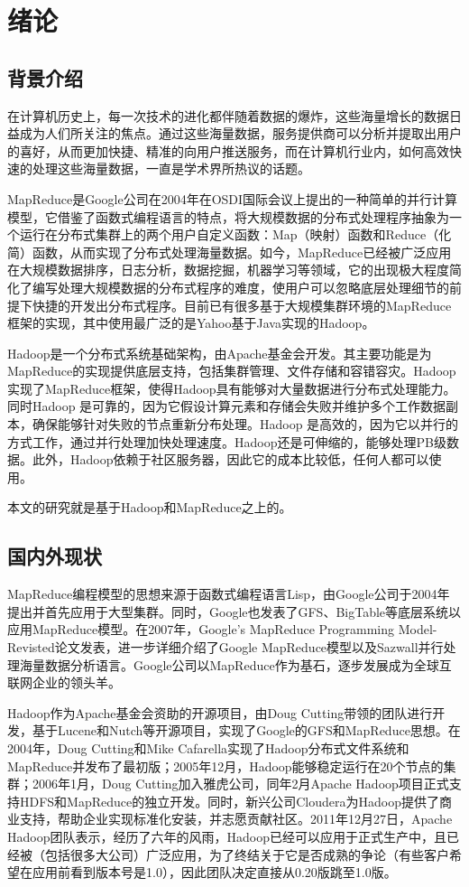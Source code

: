 \chapter{绪论}
\label{chap:1}

\section{背景介绍}

在计算机历史上，每一次技术的进化都伴随着数据的爆炸，这些海量增长的数据日益成为人们所关注的焦点。通过这些海量数据，服务提供商可以分析并提取出用户的喜好，从而更加快捷、精准的向用户推送服务，而在计算机行业内，如何高效快速的处理这些海量数据，一直是学术界所热议的话题。

MapReduce是Google公司在2004年在OSDI国际会议上提出的一种简单的并行计算模型\cite{paper:Google-MapReduce}，它借鉴了函数式编程语言的特点，将大规模数据的分布式处理程序抽象为一个运行在分布式集群上的两个用户自定义函数：Map（映射）函数和Reduce（化简）函数，从而实现了分布式处理海量数据。如今，MapReduce已经被广泛应用在大规模数据排序，日志分析，数据挖掘，机器学习等领域，它的出现极大程度简化了编写处理大规模数据的分布式程序的难度，使用户可以忽略底层处理细节的前提下快捷的开发出分布式程序。目前已有很多基于大规模集群环境的MapReduce框架的实现，其中使用最广泛的是Yahoo基于Java实现的Hadoop。

Hadoop是一个分布式系统基础架构\cite{site:hadoop}，由Apache基金会开发。其主要功能是为MapReduce的实现提供底层支持，包括集群管理、文件存储和容错容灾。Hadoop 实现了MapReduce框架，使得Hadoop具有能够对大量数据进行分布式处理能力。同时Hadoop 是可靠的，因为它假设计算元素和存储会失败并维护多个工作数据副本，确保能够针对失败的节点重新分布处理。Hadoop 是高效的，因为它以并行的方式工作，通过并行处理加快处理速度。Hadoop还是可伸缩的，能够处理PB级数据。此外，Hadoop依赖于社区服务器，因此它的成本比较低，任何人都可以使用。

本文的研究就是基于Hadoop和MapReduce之上的。

\section{国内外现状}
MapReduce编程模型的思想来源于函数式编程语言Lisp，由Google公司于2004年提出并首先应用于大型集群。同时，Google也发表了GFS、BigTable等底层系统以应用MapReduce模型。在2007年，Google’s MapReduce Programming Model-Revisted论文发表，进一步详细介绍了Google MapReduce模型以及Sazwall并行处理海量数据分析语言。Google公司以MapReduce作为基石，逐步发展成为全球互联网企业的领头羊。

Hadoop作为Apache基金会资助的开源项目，由Doug Cutting带领的团队进行开发，基于Lucene和Nutch等开源项目，实现了Google的GFS和MapReduce思想。在2004年，Doug Cutting和Mike Cafarella实现了Hadoop分布式文件系统和MapReduce并发布了最初版；2005年12月，Hadoop能够稳定运行在20个节点的集群；2006年1月，Doug Cutting加入雅虎公司，同年2月Apache Hadoop项目正式支持HDFS和MapReduce的独立开发。同时，新兴公司Cloudera为Hadoop提供了商业支持，帮助企业实现标准化安装，并志愿贡献社区。2011年12月27日，Apache Hadoop团队表示，经历了六年的风雨，Hadoop已经可以应用于正式生产中，且已经被（包括很多大公司）广泛应用，为了终结关于它是否成熟的争论（有些客户希望在应用前看到版本号是1.0），因此团队决定直接从0.20版跳至1.0版。

